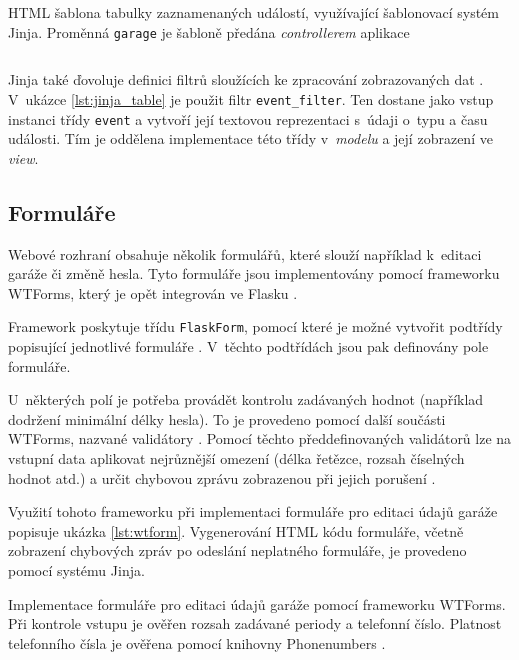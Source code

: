 \begin{listing}[htbp]
\caption{\label{lst:jinja_table} HTML šablona tabulky zaznamenaných událostí, využívající šablonovací systém Jinja. Proměnná \texttt{garage} je šabloně předána \textit{controllerem} aplikace}
\inputminted[bgcolor=codebg]{html}{source-samples/jinja_table.html}
\end{listing}

Jinja také ďovoluje definici filtrů sloužících ke zpracování zobrazovaných dat \cite{jinja}. V~ukázce \ref{lst:jinja_table} je použit filtr \texttt{event\_filter}. Ten dostane jako vstup instanci třídy \texttt{event} a vytvoří její textovou reprezentaci s~údaji o~typu a času události. Tím je oddělena implementace této třídy v~\textit{modelu} a její zobrazení ve \textit{view}.

\subsection{Formuláře}
\label{sec:im_forms}

Webové rozhraní obsahuje několik formulářů, které slouží například k~editaci garáže či změně hesla. Tyto formuláře jsou implementovány pomocí frameworku WTForms, který je opět integrován ve Flasku \cite{flask_wtf}.

Framework poskytuje třídu \texttt{FlaskForm}, pomocí které je možné vytvořit podtřídy popisující jednotlivé formuláře \cite{flask_wtf}. V~těchto podtřídách jsou pak definovány pole formuláře.

U~některých polí je potřeba provádět kontrolu zadávaných hodnot (například dodržení minimální délky hesla). To je provedeno pomocí další součásti WTForms, nazvané validátory \cite{flask_wtf}. Pomocí těchto předdefinovaných validátorů lze na vstupní data aplikovat nejrůznější omezení (délka řetězce, rozsah číselných hodnot atd.) a určit chybovou zprávu zobrazenou při jejich porušení \cite{flask_wtf}.

Využití tohoto frameworku při implementaci formuláře pro editaci údajů garáže popisuje ukázka \ref{lst:wtform}. Vygenerování HTML kódu formuláře, včetně zobrazení chybových zpráv po odeslání neplatného formuláře, je provedeno pomocí systému Jinja.

\begin{listing}[htbp]
\caption{\label{lst:wtform} Implementace formuláře pro editaci údajů garáže pomocí frameworku WTForms. Při kontrole vstupu je ověřen rozsah zadávané periody a telefonní číslo. Platnost telefonního čísla je ověřena pomocí knihovny Phonenumbers \cite{phonenumbers}.}
\inputminted[bgcolor=codebg]{python}{source-samples/wtform.py}
\end{listing}


